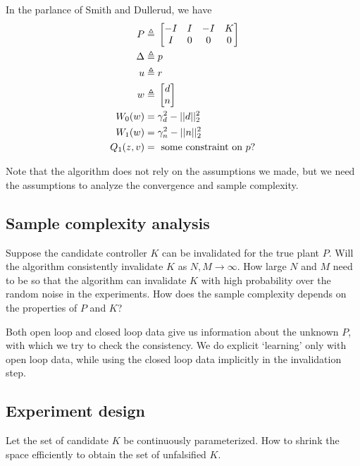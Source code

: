 \documentclass[11pt, onecolumn]{article}
\newcommand{\qq}[1]{{\color{magenta}{(#1)}}}
\begin{document}
\qq{Ross: make sure it is precise}
In the parlance of Smith and Dullerud, we have
\begin{align*}
P \triangleq &\; \begin{bmatrix}-I & I & -I & K\\I & 0 & 0 & 0\end{bmatrix}\\
\Delta \triangleq &\; p \\
u \triangleq &\; r \\
w \triangleq &\; \begin{bmatrix}d\\n\end{bmatrix}\\
W_0(w) = &\; \gamma_d^2 - ||d||_2^2\\
W_1(w) = &\; \gamma_n^2 - ||n||_2^2\\
Q_1(z,v) = &\; \text{ some constraint on $p$?}
\end{align*}

\begin{remark}
  Note that the algorithm does not rely on the assumptions we made, but we need the assumptions to
  analyze the convergence and sample complexity.
\end{remark}

\subsection{Sample complexity analysis}

Suppose the candidate controller $K$ can be invalidated for the true plant $P$.   Will
the algorithm consistently invalidate $K$ as $N,M\to\infty$.  How large $N$ and $M$ need to be so that the
algorithm can invalidate $K$ with high probability over the random noise in the experiments. How
does the sample complexity depends on the properties of $P$ and $K$?

Both open loop and closed loop data give us information about the unknown $P$, with which we try to
check the consistency.  We do explicit `learning' only with open loop data, while using the closed
loop data implicitly in the invalidation step.


\subsection{Experiment design}

Let the set of candidate $K$ be continuously parameterized. How to shrink the space efficiently to
obtain the set of unfalsified $K$.

\end{document}

